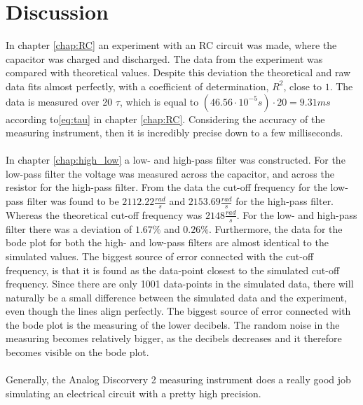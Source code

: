 \chapter{Discussion}
In chapter \ref{chap:RC} an experiment with an RC circuit was made, where the capacitor was charged and discharged. The data from the experiment was compared with theoretical values. Despite this deviation the theoretical and raw data fits almost perfectly, with a coefficient of determination, $R^2$, close to $1$. The data is measured over 20 $\tau$, which is equal to $\left(46.56 \cdot 10^{-5}s \right) \cdot 20 = 9.31 ms$ according to\eqref{eq:tau} in chapter \ref{chap:RC}. Considering the accuracy of the measuring instrument, then it is incredibly precise down to a few milliseconds. 
\\ \\
In chapter \ref{chap:high_low} a low- and high-pass filter was constructed. For the low-pass filter the voltage was measured across the capacitor, and across the resistor for the high-pass filter. From the data the cut-off frequency for the low-pass filter was found to be $2112.22 \frac{rad}{s}$ and $2153.69 \frac{rad}{s}$ for the high-pass filter. Whereas the theoretical cut-off frequency was $2148 \frac{rad}{s}$. For the low- and high-pass filter there was a deviation of $1.67 \% $ and $0.26 \% $. Furthermore, the data for the bode plot for both the high- and low-pass filters are almost identical to the simulated values. The biggest source of error connected with the cut-off frequency, is that it is found as the data-point closest to the simulated cut-off frequency. Since there are only 1001 data-points in the simulated data, there will naturally be a small difference between the simulated data and the experiment, even though the lines align perfectly. The biggest source of error connected with the bode plot is the measuring of the lower decibels. The random noise in the measuring becomes relatively bigger, as the decibels decreases and it therefore becomes visible on the bode plot.
\\ \\
Generally, the Analog Discorvery 2 measuring instrument does a really good job simulating an electrical circuit with a pretty high precision. 